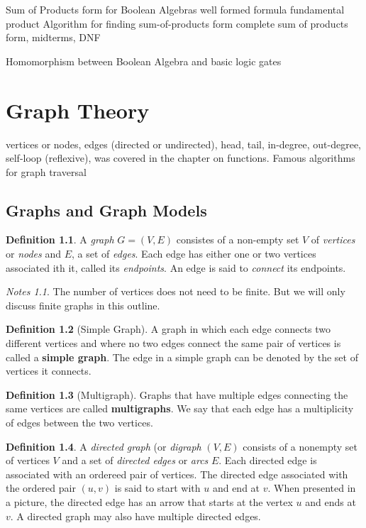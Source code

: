 \documentclass[11pt]{book} %
\theoremstyle {definition}
\newtheorem {definition}{Definition}[section]
\theoremstyle {remark}
\newtheorem*{notes}{Notes}
\begin{document}
Sum of Products form for Boolean Algebras
well formed formula
fundamental product
Algorithm for finding sum-of-products form
complete sum of products form, midterms, DNF

Homomorphism between Boolean Algebra and basic logic gates



\chapter {Graph Theory}
vertices or nodes, edges (directed or undirected), head, tail, in-degree, out-degree, self-loop (reflexive), was covered in the chapter on functions.
Famous algorithms for graph traversal


\section {Graphs and Graph Models}
\begin{definition}
A \textit{graph} $G =(V,E)$ consistes of a non-empty set $V$ of \textit{vertices} or \textit{nodes} and $E$, a set of \textit{edges}. Each edge has either one or two vertices associated ith it, called its \textit{endpoints}. An edge is said to \textit{connect} its endpoints.
\end{definition}
\begin{notes}
The number of vertices does not need to be finite. But we will only discuss finite graphs in this outline.
\end{notes}

\begin {definition} [Simple Graph]
A graph in which each edge connects two different vertices and where no two edges connect the same pair of vertices is called a \textbf{simple graph}. The edge in a simple graph can be denoted by the set of vertices it connects.
\end{definition}

\begin {definition}[Multigraph]
Graphs that have multiple edges connecting the same vertices are called \textbf{multigraphs}. We say that each edge has a multiplicity of edges between the two vertices.
\end{definition}

\begin{definition}
A \textit{directed graph} (or \textit{digraph} $(V,E)$ consists of a nonempty set of vertices $V$ and a set of \textit{directed edges} or \textit{arcs} $E$. Each directed edge is associated with an ordereed pair of vertices. The directed edge associated with the ordered pair $(u,v)$ is said to start with $u$ and end at $v$. When presented in a picture, the directed edge has an arrow that starts at the vertex $u$ and ends at $v$. A directed graph may also have multiple directed edges.
\end{definition}
\end{document}
